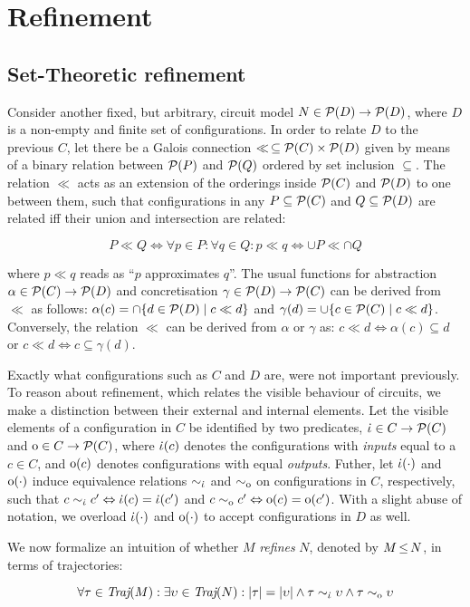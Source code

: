 \section{Refinement}

\subsection{Set-Theoretic refinement}

Consider another fixed, but arbitrary, circuit model $N \in \mathcal{P}(D) \rightarrow \mathcal{P}(D)$, where $D$ is a non-empty and finite set of configurations. In order to relate $D$ to the previous $C$, let there be a Galois connection $\ll \, \subseteq \mathcal{P}(C) \times \mathcal{P}(D)$ given by means of a binary relation between $\mathcal{P}(P)$ and $\mathcal{P}(Q)$ ordered by set inclusion $\subseteq$. The relation $\ll$ acts as an extension of the orderings inside $\mathcal{P}(C)$ and $\mathcal{P}(D)$ to one between them, such that configurations in any $P \subseteq \mathcal{P}(C)$ and $Q \subseteq \mathcal{P}(D)$ are related iff their union and intersection are related:

\begin{equation*}
P \ll Q \iff \forall p \in P : \forall q \in Q : p \ll q \iff \cup P \ll \cap Q
\end{equation*}

\noindent where $p \ll q$ reads as ``$p$ approximates $q$''. The usual functions for abstraction $\alpha \in \mathcal{P}(C) \rightarrow \mathcal{P}(D)$ and concretisation $\gamma \in \mathcal{P}(D) \rightarrow \mathcal{P}(C)$ can be derived from $\ll$ as follows: $\alpha(c) = \cap \{ d \in \mathcal{P}(D) \mid c \ll d \}$ and $\gamma(d) = \cup \{ c \in \mathcal{P}(C) \mid c \ll d \}$. Conversely, the relation $\ll$ can be derived from $\alpha$ or $\gamma$ as: $c \ll d \iff \alpha(c) \subseteq d$ or $c \ll d \iff c \subseteq \gamma(d)$. 

Exactly what configurations such as $C$ and $D$ are, were not important previously. To reason about refinement, which relates the visible behaviour of circuits, we make a distinction between their external and internal elements. Let the visible elements of a configuration in $C$ be identified by two predicates, $\dot{\iota} \in C \rightarrow \mathcal{P}(C)$ and $\mathrm{o} \in C \rightarrow \mathcal{P}(C)$, where $\dot{\iota}(c)$ denotes the configurations with \textit{inputs} equal to a $c \in C$, and $\mathrm{o}(c)$ denotes configurations with equal \textit{outputs}. Futher, let $\dot{\iota}(\cdot)$ and $\mathrm{o}(\cdot)$ induce equivalence relations $\sim_{\dot{\iota}}$ and $\sim_{\mathrm{o}}$ on configurations in $C$, respectively, such that $c \sim_{\dot{\iota}} c' \Leftrightarrow \dot{\iota}(c) = \dot{\iota}(c')$ and $c \sim_{\mathrm{o}} c' \Leftrightarrow \mathrm{o}(c) = \mathrm{o}(c')$. With a slight abuse of notation, we overload $\dot{\iota}(\cdot)$ and $\mathrm{o}(\cdot)$ to accept configurations in $D$ as well.

We now formalize an intuition of whether $M$ \textit{refines} $N$, denoted by $M \operatorname{\leq} N$, in terms of trajectories:

\begin{equation*}
\forall \tau \in \operatorname{\textit{Traj}}(M) : \exists \upsilon \in \operatorname{\textit{Traj}}(N) : | \tau | = | \upsilon | \wedge \tau \sim_{\dot{\iota}} \upsilon \wedge \tau \sim_{\mathrm{o}} \upsilon
\end{equation*}
